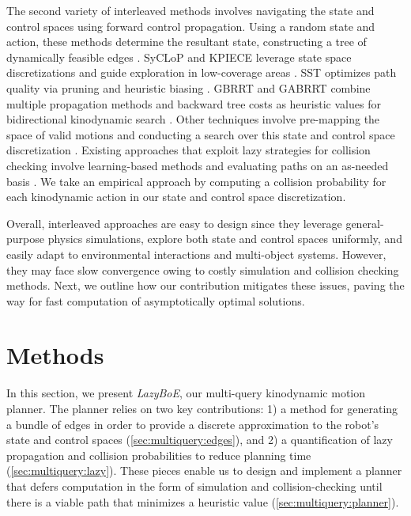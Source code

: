 The second variety of interleaved methods involves navigating the state and control spaces using forward control propagation. Using a random state and action, these methods determine the resultant state, constructing a tree of dynamically feasible edges \cite{pasricha2022pokerrt}.
SyCLoP and KPIECE leverage state space discretizations and guide exploration in low-coverage areas \cite{plaku2010motion,sucan2011sampling}.
SST optimizes path quality via pruning and heuristic biasing \cite{li2016asymptotically}.
GBRRT and GABRRT combine multiple propagation methods and backward tree costs as heuristic values for bidirectional kinodynamic search \cite{nayak2022bidirectional}. Other techniques involve pre-mapping the space of valid motions and conducting a search over this state and control space discretization \cite{shome2021asymptotically,bordalba2018randomized}.
Existing approaches that exploit lazy strategies for collision checking involve learning-based methods \cite{yu2021reducing} and evaluating paths on an as-needed basis \cite{kavraki2000path,mandalika2019generalized,hauser2015lazy}. We take an empirical approach by computing a collision probability for each kinodynamic action in our state and control space discretization.

Overall, interleaved approaches are easy to design since they leverage general-purpose physics simulations, explore both state and control spaces uniformly, and easily adapt to environmental interactions and multi-object systems. However, they may face slow convergence owing to costly simulation and collision checking methods. Next, we outline how our contribution mitigates these issues, paving the way for fast computation of asymptotically optimal solutions.

\section{Methods}
\label{sec:multiquery:method}

In this section, we present \textsl{LazyBoE}, our multi-query kinodynamic motion planner. The planner relies on two key contributions: 1) a method for generating a bundle of edges in order to provide a discrete approximation to the robot's state and control spaces (\cref{sec:multiquery:edges}), and 2) a quantification of lazy propagation and collision probabilities to reduce planning time (\cref{sec:multiquery:lazy}). These pieces enable us to design and implement a planner that defers computation in the form of simulation and collision-checking until there is a viable path that minimizes a heuristic value (\cref{sec:multiquery:planner}).

